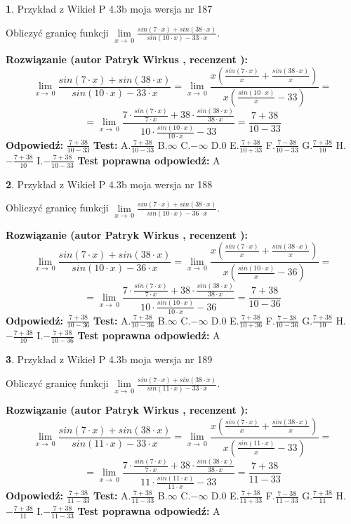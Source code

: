 \documentclass[12pt, a4paper]{article}
\theoremstyle{definition} %
\newtheorem{zad}{}
\newcommand{\zadStart}[1]{\begin{zad}#1\newline}
\newcommand{\zadStop}{\end{zad}}
\newcommand{\rozwStart}[2]{\noindent \textbf{Rozwiązanie (autor #1 , recenzent #2): }\newline}
\newcommand{\rozwStop}{\newline}
\newcommand{\odpStart}{\noindent \textbf{Odpowiedź:}\newline}
\newcommand{\odpStop}{\newline}
\newcommand{\testStart}{\noindent \textbf{Test:}\newline}
\newcommand{\testStop}{\newline}
\newcommand{\kluczStart}{\noindent \textbf{Test poprawna odpowiedź:}\newline}
\newcommand{\kluczStop}{\newline}
\begin{document}
\zadStart{Przykład z Wikieł P 4.3b moja wersja nr 187}


Obliczyć granicę funkcji $\lim\limits_{x\to\ 0}\frac{sin(7 \cdot x)+sin(38 \cdot x)}{sin(10 \cdot x)-33 \cdot x}$.
\zadStop
\rozwStart{Patryk Wirkus}{}
$$\lim\limits_{x\to\ 0}\frac{sin(7 \cdot x)+sin(38 \cdot x)}{sin(10 \cdot x)-33 \cdot x}=\lim\limits_{x\to\ 0}\frac{x(\frac{sin(7 \cdot x)}{x}+\frac{sin(38 \cdot x)}{x})}{x(\frac{sin(10 \cdot x)}{x}-33)}=$$
$$=\lim\limits_{x\to\ 0}\frac{7 \cdot \frac{sin(7 \cdot x)}{7 \cdot x}+38 \cdot \frac{sin(38 \cdot x)}{38 \cdot x}}{10 \cdot \frac{sin(10 \cdot x)}{10 \cdot x}-33}=\frac{7+38}{10-33}$$
\rozwStop
\odpStart
$\frac{7+38}{10-33}$
\odpStop
\testStart
A.$\frac{7+38}{10-33}$
B.$\infty$
C.$-\infty$
D.$0$
E.$\frac{7+38}{10+33}$
F.$\frac{7-38}{10-33}$
G.$\frac{7+38}{10}$
H.$-\frac{7+38}{10}$
I.$-\frac{7+38}{10-33}$
\testStop
\kluczStart
A
\kluczStop



\zadStart{Przykład z Wikieł P 4.3b moja wersja nr 188}


Obliczyć granicę funkcji $\lim\limits_{x\to\ 0}\frac{sin(7 \cdot x)+sin(38 \cdot x)}{sin(10 \cdot x)-36 \cdot x}$.
\zadStop
\rozwStart{Patryk Wirkus}{}
$$\lim\limits_{x\to\ 0}\frac{sin(7 \cdot x)+sin(38 \cdot x)}{sin(10 \cdot x)-36 \cdot x}=\lim\limits_{x\to\ 0}\frac{x(\frac{sin(7 \cdot x)}{x}+\frac{sin(38 \cdot x)}{x})}{x(\frac{sin(10 \cdot x)}{x}-36)}=$$
$$=\lim\limits_{x\to\ 0}\frac{7 \cdot \frac{sin(7 \cdot x)}{7 \cdot x}+38 \cdot \frac{sin(38 \cdot x)}{38 \cdot x}}{10 \cdot \frac{sin(10 \cdot x)}{10 \cdot x}-36}=\frac{7+38}{10-36}$$
\rozwStop
\odpStart
$\frac{7+38}{10-36}$
\odpStop
\testStart
A.$\frac{7+38}{10-36}$
B.$\infty$
C.$-\infty$
D.$0$
E.$\frac{7+38}{10+36}$
F.$\frac{7-38}{10-36}$
G.$\frac{7+38}{10}$
H.$-\frac{7+38}{10}$
I.$-\frac{7+38}{10-36}$
\testStop
\kluczStart
A
\kluczStop



\zadStart{Przykład z Wikieł P 4.3b moja wersja nr 189}


Obliczyć granicę funkcji $\lim\limits_{x\to\ 0}\frac{sin(7 \cdot x)+sin(38 \cdot x)}{sin(11 \cdot x)-33 \cdot x}$.
\zadStop
\rozwStart{Patryk Wirkus}{}
$$\lim\limits_{x\to\ 0}\frac{sin(7 \cdot x)+sin(38 \cdot x)}{sin(11 \cdot x)-33 \cdot x}=\lim\limits_{x\to\ 0}\frac{x(\frac{sin(7 \cdot x)}{x}+\frac{sin(38 \cdot x)}{x})}{x(\frac{sin(11 \cdot x)}{x}-33)}=$$
$$=\lim\limits_{x\to\ 0}\frac{7 \cdot \frac{sin(7 \cdot x)}{7 \cdot x}+38 \cdot \frac{sin(38 \cdot x)}{38 \cdot x}}{11 \cdot \frac{sin(11 \cdot x)}{11 \cdot x}-33}=\frac{7+38}{11-33}$$
\rozwStop
\odpStart
$\frac{7+38}{11-33}$
\odpStop
\testStart
A.$\frac{7+38}{11-33}$
B.$\infty$
C.$-\infty$
D.$0$
E.$\frac{7+38}{11+33}$
F.$\frac{7-38}{11-33}$
G.$\frac{7+38}{11}$
H.$-\frac{7+38}{11}$
I.$-\frac{7+38}{11-33}$
\testStop
\kluczStart
A
\kluczStop
\end{document}
